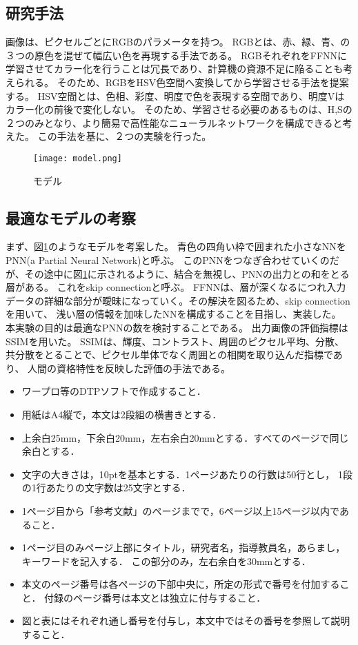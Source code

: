 \documentclass[twocolumn,fleqn]{jsarticle}
\begin{document}
\subsection{研究手法}
画像は、ピクセルごとにRGBのパラメータを持つ。
RGBとは、赤、緑、青、の３つの原色を混ぜて幅広い色を再現する手法である。
RGBそれぞれをFFNNに学習させてカラー化を行うことは冗長であり、計算機の資源不足に陥ることも考えられる。
そのため、RGBをHSV色空間へ変換してから学習させる手法を提案する。
HSV空間とは、色相、彩度、明度で色を表現する空間であり、明度Vはカラー化の前後で変化しない。
そのため、学習させる必要のあるものは、H,Sの２つのみとなり、より簡易で高性能なニューラルネットワークを構成できると考えた。
この手法を基に、２つの実験を行った。

\begin{figure}[tb]
\centering
\texttt{[image: model.png]}
\caption{モデル}
\label{fig:model}
\end{figure}

\subsection{最適なモデルの考察}
まず、図\ref{fig:model}のようなモデルを考案した。
青色の四角い枠で囲まれた小さなNNをPNN(a Partial Neural Network)と呼ぶ。
このPNNをつなぎ合わせていくのだが、その途中に図\ref{fig:model}に示されるように、結合を無視し、PNNの出力との和をとる層がある。
これをskip connectionと呼ぶ。
FFNNは、層が深くなるにつれ入力データの詳細な部分が曖昧になっていく。その解決を図るため、skip connectionを用いて、
浅い層の情報を加味したNNを構成することを目指し、実装した。
本実験の目的は最適なPNNの数を検討することである。
出力画像の評価指標はSSIMを用いた。
SSIMは、輝度、コントラスト、周囲のピクセル平均、分散、共分散をとることで、ピクセル単体でなく周囲との相関を取り込んだ指標であり、
人間の資格特性を反映した評価の手法である。



\begin{itemize}
\item ワープロ等のDTPソフトで作成すること．
\item 用紙はA4縦で，本文は2段組の横書きとする．
\item 上余白25mm，下余白20mm，左右余白20mmとする．すべてのページで同じ余白とする．
\item 文字の大きさは，10ptを基本とする．1ページあたりの行数は50行とし，
1段の1行あたりの文字数は25文字とする．
\item 1ページ目から「参考文献」のページまでで，6ページ以上15ページ以内であること．
\item 1ページ目のみページ上部にタイトル，研究者名，指導教員名，あらまし，キーワードを記入する．
この部分のみ，左右余白を30mmとする．
\item 本文のページ番号は各ページの下部中央に，所定の形式で番号を付加すること．
付録のページ番号は本文とは独立に付与すること．
\item 図と表にはそれぞれ通し番号を付与し，本文中ではその番号を参照して説明すること．
\end{itemize}
\end{document}
